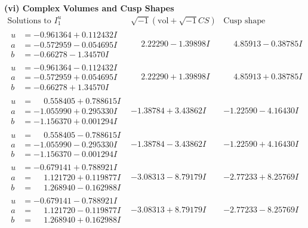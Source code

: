 \documentclass[1p]{elsarticle_modified}
\theoremstyle{definition}
\newcommand{\I}{\sqrt{-1}}
\begin{document}
\newpage\flushleft \textbf{(vi) Complex Volumes and Cusp Shapes}
$$\begin{array}{c|c|c}  
\text{Solutions to }I^u_{1}& \I (\text{vol} + \sqrt{-1}CS) & \text{Cusp shape}\\
 \hline 
\begin{aligned}
u &= -0.961364 + 0.112432 I \\
a &= -0.572959 - 0.054695 I \\
b &= -0.66278 - 1.34570 I\end{aligned}
 & \phantom{-}2.22290 - 1.39898 I & \phantom{-}4.85913 - 0.38785 I \\ \hline\begin{aligned}
u &= -0.961364 - 0.112432 I \\
a &= -0.572959 + 0.054695 I \\
b &= -0.66278 + 1.34570 I\end{aligned}
 & \phantom{-}2.22290 + 1.39898 I & \phantom{-}4.85913 + 0.38785 I \\ \hline\begin{aligned}
u &= \phantom{-}0.558405 + 0.788615 I \\
a &= -1.055990 + 0.295330 I \\
b &= -1.156370 + 0.001294 I\end{aligned}
 & -1.38784 + 3.43862 I & -1.22590 - 4.16430 I \\ \hline\begin{aligned}
u &= \phantom{-}0.558405 - 0.788615 I \\
a &= -1.055990 - 0.295330 I \\
b &= -1.156370 - 0.001294 I\end{aligned}
 & -1.38784 - 3.43862 I & -1.22590 + 4.16430 I \\ \hline\begin{aligned}
u &= -0.679141 + 0.788921 I \\
a &= \phantom{-}1.121720 + 0.119877 I \\
b &= \phantom{-}1.268940 - 0.162988 I\end{aligned}
 & -3.08313 - 8.79179 I & -2.77233 + 8.25769 I \\ \hline\begin{aligned}
u &= -0.679141 - 0.788921 I \\
a &= \phantom{-}1.121720 - 0.119877 I \\
b &= \phantom{-}1.268940 + 0.162988 I\end{aligned}
 & -3.08313 + 8.79179 I & -2.77233 - 8.25769 I \\ \hline\begin{aligned}

\end{aligned}
\end{array}$$
\end{document}
